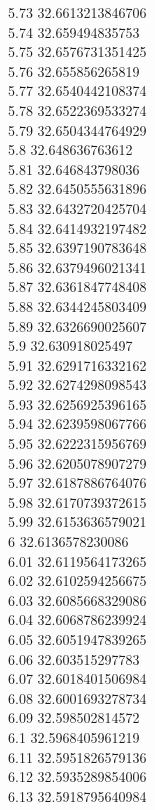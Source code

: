 {5.73	32.6613213846706\\
5.74	32.659494835753\\
5.75	32.6576731351425\\
5.76	32.655856265819\\
5.77	32.6540442108374\\
5.78	32.6522369533274\\
5.79	32.6504344764929\\
5.8	32.648636763612\\
5.81	32.646843798036\\
5.82	32.6450555631896\\
5.83	32.6432720425704\\
5.84	32.6414932197482\\
5.85	32.6397190783648\\
5.86	32.6379496021341\\
5.87	32.6361847748408\\
5.88	32.6344245803409\\
5.89	32.6326690025607\\
5.9	32.630918025497\\
5.91	32.6291716332162\\
5.92	32.6274298098543\\
5.93	32.6256925396165\\
5.94	32.6239598067766\\
5.95	32.6222315956769\\
5.96	32.6205078907279\\
5.97	32.6187886764076\\
5.98	32.6170739372615\\
5.99	32.6153636579021\\
6	32.6136578230086\\
6.01	32.6119564173265\\
6.02	32.6102594256675\\
6.03	32.6085668329086\\
6.04	32.6068786239924\\
6.05	32.6051947839265\\
6.06	32.603515297783\\
6.07	32.6018401506984\\
6.08	32.6001693278734\\
6.09	32.598502814572\\
6.1	32.5968405961219\\
6.11	32.5951826579136\\
6.12	32.5935289854006\\
6.13	32.5918795640984\\
}
